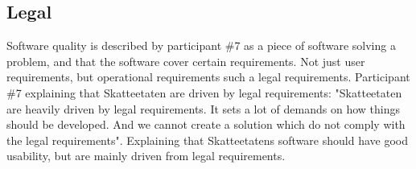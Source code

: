 




\subsection{Legal} \label{sec:legal}
Software quality is described by participant \#7 as a piece of software solving a problem, and that the software cover certain requirements. Not just user requirements, but operational requirements such a legal requirements. Participant \#7 explaining that Skatteetaten are driven by legal requirements: "Skatteetaten are heavily driven by legal requirements. It sets a lot of demands on how things should be developed. And we cannot create a solution which do not comply with the legal requirements". Explaining that Skatteetatens software should have good usability, but are mainly driven from legal requirements.

